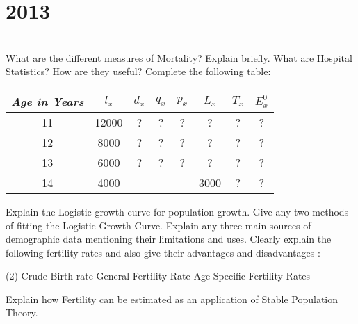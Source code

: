 \section*{2013}
\vspace{-.5cm}
\hrulefill \smallskip\\
 What are the different measures of Mortality? Explain briefly.
\myline
{} What are Hospital Statistics? How are they useful?
\myline
{} Complete the following table:
\begin{center}
    \begin{tabular}{| c | *{6}{c|} c|}
    \hline
    \emph{Age in Years} & $l_x$ & $d_x$ & $q_x$ & $p_x$ & $L_x$ & $T_x$ & $E_x^0$ \\ \hline
    11 & 12000 & ? & ? & ? & ? & ? & ?\\ \hline 
    12 & 8000  & ? & ? & ? & ? & ? & ?\\ \hline
    13 & 6000  & ? & ? & ? & ? & ? & ?\\ \hline
    14 & 4000  &   &   &   & 3000 & ? & ?\\ 
    \hline
    \end{tabular}
\end{center}
\myline
{} Explain the Logistic growth curve for population growth. Give any two methods of fitting the Logistic Growth Curve.
\myline
{} Explain any three main sources of demographic data mentioning their limitations and uses.
\myline
{} Clearly explain the following fertility rates and also give their advantages and disadvantages :
\begin{tasks}[after-item-skip = 0ex](2)
    \task Crude Birth rate
    \task General Fertility Rate
    \task Age Specific Fertility Rates
\end{tasks}
\myline
{} Explain how Fertility can be estimated as an application of Stable Population Theory. 